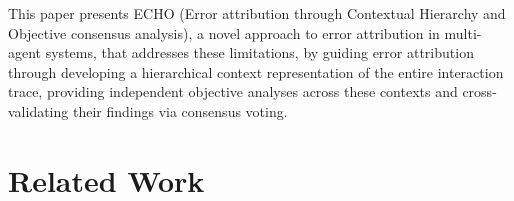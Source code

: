 \documentclass{article}
\begin{document}
This paper presents ECHO (Error attribution through Contextual Hierarchy and Objective consensus analysis), a novel approach to error attribution in multi-agent systems, that addresses these limitations, by guiding error attribution through developing a hierarchical context representation of the entire interaction trace, providing independent objective analyses across these contexts and cross-validating their findings via consensus voting.


\section{Related Work}

\end{document}
